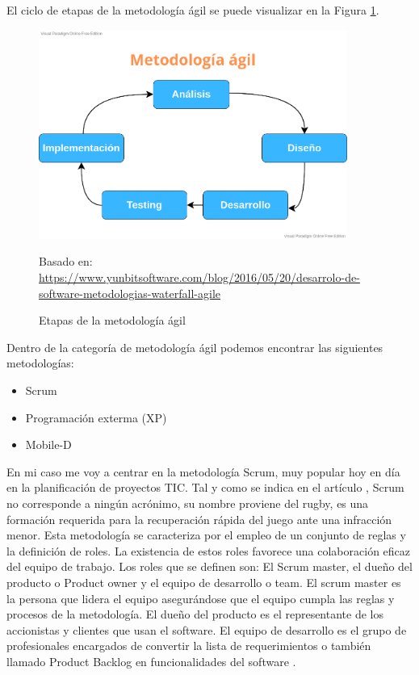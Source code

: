 El ciclo de etapas de la metodología ágil se puede visualizar en la Figura \ref{fig:etapas_agil}.

\begin{figure}[h]
\centering
\includegraphics[width=0.9\textwidth]{imagenes/03_Analisis/meto_agil.png}
\label{fig:etapas_agil}
\begin{center}
Basado en: \url{https://www.yunbitsoftware.com/blog/2016/05/20/desarrolo-de-software-metodologias-waterfall-agile}
\end{center}
\caption{Etapas de la metodología ágil}
\end{figure}

Dentro de la categoría de metodología ágil podemos encontrar las siguientes metodologías:

\begin{itemize}
\item Scrum
\item Programación exterma (XP)
\item Mobile-D
\end{itemize}

En mi caso me voy a centrar en la metodología Scrum, muy popular hoy en día en la planificación de proyectos \gls{TIC}. Tal y como se indica en el artículo \cite{RefWorks:RefID:11-cevallos2018metodologias}, Scrum no corresponde a ningún acrónimo, su nombre proviene del rugby, es una formación requerida para la recuperación rápida del juego ante una infracción menor. Esta metodología se caracteriza por el empleo de un conjunto de reglas y la definición de roles. La existencia de estos roles favorece una colaboración eficaz del equipo de trabajo.
Los roles que se definen son: El Scrum master, el dueño del producto o Product owner y el equipo de desarrollo o team. El scrum master es la persona que lidera el equipo asegurándose que el equipo cumpla las reglas y procesos de la metodología. El dueño del producto es el representante de los accionistas y clientes que usan el software. El equipo de desarrollo es el grupo de profesionales encargados de convertir la lista de requerimientos o también llamado Product Backlog en funcionalidades del software \cite{RefWorks:RefID:11-cevallos2018metodologias}.


